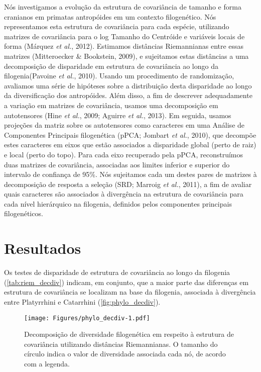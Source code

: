 \documentclass[11pt,twoside]{report}
\begin{document}
Nós investigamos a evolução da estrutura de covariância de tamanho e
forma cranianos em primatas antropóides em um contexto filogenético. Nós
representamos esta estrutura de covariância para cada espécie,
utilizando matrizes de covariância para o log Tamanho do Centróide e
variáveis locais de forma (Márquez \emph{et al.}, 2012). Estimamos
distâncias Riemannianas entre essas matrizes (Mitteroecker \& Bookstein,
2009), e sujeitamos estas distâncias a uma decomposição de disparidade
em estrutura de covariância ao longo da filogenia(Pavoine \emph{et al.},
2010). Usando um procedimento de randomização, avaliamos uma série de
hipóteses sobre a distribuição desta disparidade ao longo da
diversificação dos antropóides. Além disso, a fim de descrever
adequadamente a variação em matrizes de covariância, usamos uma
decomposição em autotensores (Hine \emph{et al.}, 2009; Aguirre \emph{et
al.}, 2013). Em seguida, usamos projeções da matriz sobre os
autotensores como caracteres em uma Análise de Componentes Principais
filogenética (pPCA; Jombart \emph{et al.}, 2010), que decompõe estes
caracteres em eixos que estão associados a disparidade global (perto de
raiz) e local (perto do topo). Para cada eixo recuperado pela pPCA,
reconstruímos duas matrizes de covariância, associadas aos limites
inferior e superior do intervalo de confiança de 95\%. Nós sujeitamos
cada um destes pares de matrizes à decomposição de resposta a seleção
(SRD; Marroig \emph{et al.}, 2011), a fim de avaliar quais caracteres
são associados à divergência na estrutura de covariância para cada nível
hierárquico na filogenia, definidos pelos componentes principais
filogenéticos.

\section{Resultados}\label{resultados}

Os testes de disparidade de estrutura de covariância ao longo da
filogenia (\autoref{tab:riem_decdiv}) indicam, em conjunto, que a maior
parte das diferenças em estrutura de covariância se localizam na base da
filogenia, associada à divergência entre Platyrrhini e Catarrhini
(\autoref{fig:phylo_decdiv}).



\begin{figure}[htbp]
\centering
\texttt{[image: Figures/phylo\_decdiv-1.pdf]}
\caption{Decomposição de diversidade filogenética em respeito à
estrutura de covariância utilizando distâncias Riemannianas. O tamanho
do círculo indica o valor de diversidade associada cada nó, de acordo
com a legenda. \label{fig:phylo_decdiv}}
\end{figure}
\end{document}

